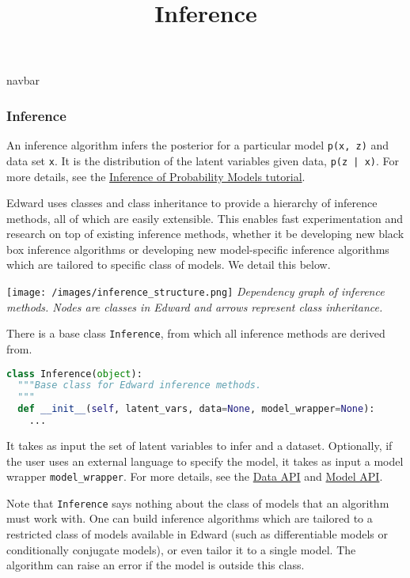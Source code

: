 \title{Inference}

{{navbar}}

\subsubsection{Inference}

An inference algorithm infers the posterior for a particular model
\texttt{p(x, z)} and data set \texttt{x}. It is the distribution of the latent
variables given data, \texttt{p(z | x)}. For more details, see the
\href{/tutorials/inference}
{Inference of Probability Models tutorial}.

Edward uses classes and class inheritance to provide a
hierarchy of inference methods, all of which are easily extensible.
This enables fast experimentation and research on top of existing
inference methods, whether it be developing new black box inference
algorithms or developing new model-specific inference algorithms which
are tailored to specific class of models.
We detail this below.

\texttt{[image: /images/inference\_structure.png]}
{\small\textit{Dependency graph of inference methods.
Nodes are classes in Edward and arrows represent class inheritance.}}

There is a base class \texttt{Inference}, from which all inference
methods are derived from.

\begin{lstlisting}[language=Python]
class Inference(object):
  """Base class for Edward inference methods.
  """
  def __init__(self, latent_vars, data=None, model_wrapper=None):
    ...
\end{lstlisting}

It takes as input the set of latent variables to infer and a dataset. Optionally, if the user uses an external language to specify the model, it takes as input a model wrapper \texttt{model_wrapper}.
For more details, see the
\href{/api/data}
{Data API}
and
\href{/api/model}
{Model API}.

Note that \texttt{Inference} says nothing about the class of models that an
algorithm must work with. One can build inference algorithms which are
tailored to a restricted class of models available in Edward (such as
differentiable models or conditionally conjugate models), or even
tailor it to a single model. The algorithm can raise an error if the
model is outside this class.

